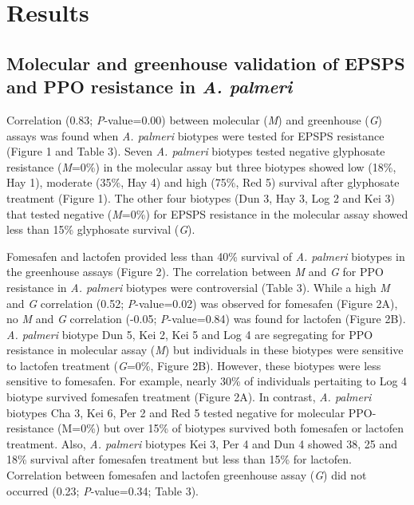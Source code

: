 \documentclass[10pt,letterpaper]{article}
\begin{document}
\hypertarget{results}{%
\section{Results}\label{results}}

\hypertarget{molecular-and-greenhouse-validation-of-epsps-and-ppo-resistance-in-a.-palmeri-1}{%
\subsection{\texorpdfstring{Molecular and greenhouse validation of EPSPS
and PPO resistance in \emph{A.
palmeri}}{Molecular and greenhouse validation of EPSPS and PPO resistance in A. palmeri}}\label{molecular-and-greenhouse-validation-of-epsps-and-ppo-resistance-in-a.-palmeri-1}}

Correlation (0.83; \emph{P}-value=0.00) between molecular (\emph{M}) and
greenhouse (\emph{G}) assays was found when \emph{A. palmeri} biotypes
were tested for EPSPS resistance (Figure 1 and Table 3). Seven \emph{A.
palmeri} biotypes tested negative glyphosate resistance (\emph{M}=0\%)
in the molecular assay but three biotypes showed low (18\%, Hay 1),
moderate (35\%, Hay 4) and high (75\%, Red 5) survival after glyphosate
treatment (Figure 1). The other four biotypes (Dun 3, Hay 3, Log 2 and
Kei 3) that tested negative (\emph{M}=0\%) for EPSPS resistance in the
molecular assay showed less than 15\% glyphosate survival (\emph{G}).

Fomesafen and lactofen provided less than 40\% survival of \emph{A.
palmeri} biotypes in the greenhouse assays (Figure 2). The correlation
between \emph{M} and \emph{G} for PPO resistance in \emph{A. palmeri}
biotypes were controversial (Table 3). While a high \emph{M} and
\emph{G} correlation (0.52; \emph{P}-value=0.02) was observed for
fomesafen (Figure 2A), no \emph{M} and \emph{G} correlation (-0.05;
\emph{P}-value=0.84) was found for lactofen (Figure 2B). \emph{A.
palmeri} biotype Dun 5, Kei 2, Kei 5 and Log 4 are segregating for PPO
resistance in molecular assay (\emph{M}) but individuals in these
biotypes were sensitive to lactofen treatment (\emph{G}=0\%, Figure 2B).
However, these biotypes were less sensitive to fomesafen. For example,
nearly 30\% of individuals pertaiting to Log 4 biotype survived
fomesafen treatment (Figure 2A). In contrast, \emph{A. palmeri} biotypes
Cha 3, Kei 6, Per 2 and Red 5 tested negative for molecular
PPO-resistance (M=0\%) but over 15\% of biotypes survived both fomesafen
or lactofen treatment. Also, \emph{A. palmeri} biotypes Kei 3, Per 4 and
Dun 4 showed 38, 25 and 18\% survival after fomesafen treatment but less
than 15\% for lactofen. Correlation between fomesafen and lactofen
greenhouse assay (\emph{G}) did not occurred (0.23; \emph{P}-value=0.34;
Table 3).
\end{document}
